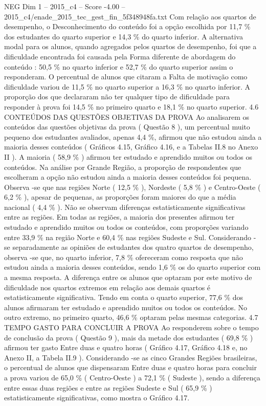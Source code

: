 \begin{textsample}{NEG Dim 1 – 2015\_c4 – Score -4.00 – 2015\_c4/enade\_2015\_tec\_gest\_fin\_5f348948fa.txt}
Com relação aos quartos de desempenho, o Desconhecimento do conteúdo foi a opção escolhida por 11,7 \% dos estudantes do quarto superior e 14,3 \% do quarto inferior.
A alternativa modal para os alunos, quando agregados pelos quartos de desempenho, foi que a dificuldade encontrada foi causada pela Forma diferente de abordagem do conteúdo : 50,5 \% no quarto inferior e 52,7 \% do quarto superior assim o responderam.
O percentual de alunos que citaram a Falta de motivação como dificuldade variou de 11,5 \% no quarto superior a 16,3 \% no quarto inferior.
A proporção dos que declararam não ter qualquer tipo de dificuldade para responder à prova foi 14,5 \% no primeiro quarto e 18,1 \% no quarto superior. 4.6 CONTEÚDOS DAS QUESTÕES OBJETIVAS DA PROVA Ao analisarem os conteúdos das questões objetivas da prova ( Questão 8 ), um percentual muito pequeno dos estudantes avaliados, apenas 4,4 \%, afirmou que não estudou ainda a maioria desses conteúdos ( Gráficos 4.15, Gráfico 4.16, e a Tabelas II.8 no Anexo II ).
A maioria ( 58,9 \% ) afirmou ter estudado e aprendido muitos ou todos os conteúdos.
Na análise por Grande Região, a proporção de respondentes que escolheram a opção não estudou ainda a maioria desses conteúdos foi pequena.
Observa -se que nas regiões Norte ( 12,5 \% ), Nordeste ( 5,8 \% ) e Centro-Oeste ( 6,2 \% ), apesar de pequenas, as proporções foram maiores do que a média nacional ( 4,4 \% ).
Não se observam diferenças estatisticamente significativas entre as regiões.
Em todas as regiões, a maioria dos presentes afirmou ter estudado e aprendido muitos ou todos os conteúdos, com proporções variando entre 33,9 \% na região Norte e 60,4 \% nas regiões Sudeste e Sul.
Considerando -se separadamente as opiniões de estudantes dos quatro quartos de desempenho, observa -se que, no quarto inferior, 7,8 \% ofereceram como resposta que não estudou ainda a maioria desses conteúdos, sendo 1,6 \% os do quarto superior com a mesma resposta.
A diferença entre os alunos que optaram por este motivo de dificuldade nos quartos extremos em relação aos demais quartos é estatisticamente significativa.
Tendo em conta o quarto superior, 77,6 \% dos alunos afirmaram ter estudado e aprendido muitos ou todos os conteúdos.
No outro extremo, no primeiro quarto, 46,6 \% optaram pelas mesmas categorias. 4.7 TEMPO GASTO PARA CONCLUIR A PROVA Ao responderem sobre o tempo de conclusão da prova ( Questão 9 ), mais da metade dos estudantes ( 69,8 \% ) afirmou ter gasto Entre duas e quatro horas ( Gráfico 4.17, Gráfico 4.18 e, no Anexo II, a Tabela II.9 ).
Considerando -se as cinco Grandes Regiões brasileiras, o percentual de alunos que dispensaram Entre duas e quatro horas para concluir a prova variou de 65,0 \% ( Centro-Oeste ) a 72,1 \% ( Sudeste ), sendo a diferença entre essas duas regiões e entre as regiões Sudeste e Sul ( 65,9 \% ) estatisticamente significativas, como mostra o Gráfico 4.17.

\end{textsample}
